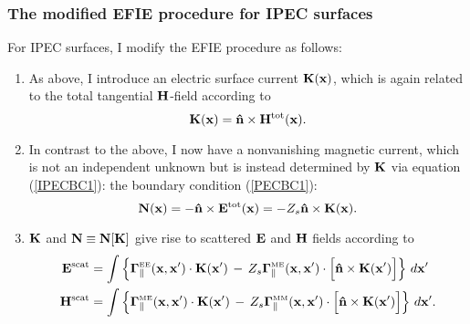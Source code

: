 \documentclass{article}
\begin{document}
\subsubsection*{The modified EFIE procedure for IPEC surfaces}
 
For IPEC surfaces, I modify the EFIE procedure as follows:
%
\begin{enumerate}
 \item As above, I introduce an electric surface current $\mathbf{K}(\mathbf{x})$,
       which is again related to the total tangential $\mathbf{H}$-field 
       according to 
       $$\mathbf{K}(\mathbf{x}) = \mathbf{\hat n}\times \mathbf{H}^{\hbox{\scriptsize{tot}}}(\mathbf{x}).$$
 \item In contrast to the above, I now have a nonvanishing magnetic 
       current, which is not an independent unknown but is instead
       determined by $\mathbf{K}$ via equation (\ref{IPECBC1}):
       the boundary condition (\ref{PECBC1}):
       $$\mathbf{N}(\mathbf{x}) = -\mathbf{\hat n}\times \mathbf{E}^{\hbox{\scriptsize{tot}}}(\mathbf{x})
                      = -Z_s \mathbf{\hat n}\times \mathbf{K}(\mathbf{x}).$$
 \item $\mathbf{K}$ and $\mathbf{N}\equiv \mathbf{N}[\mathbf{K}]$ give rise to scattered $\mathbf{E}$ and 
       $\mathbf{H}$ fields according to
       \begin{align*}
         \mathbf{E}^{\hbox{\scriptsize{scat}}} &= 
           \int \left\{       \boldsymbol{\Gamma}_{\parallel}^{\hbox{\tiny{EE}}}(\mathbf{x}, \mathbf{x}^\prime) 
                        \cdot \mathbf{K}(\mathbf{x}^\prime)
                        \,-\, 
                           Z_s\boldsymbol{\Gamma}_{\parallel}^{\hbox{\tiny{ME}}}(\mathbf{x}, \mathbf{x}^\prime) 
                        \cdot \Big[\mathbf{\hat n}\times \mathbf{K}(\mathbf{x}^\prime)\Big] 
                \right\}\,d\mathbf{x}^\prime
         \\
         \mathbf{H}^{\hbox{\scriptsize{scat}}} &= 
           \int \left\{       \boldsymbol{\Gamma}_{\parallel}^{\hbox{\tiny{ME}}}(\mathbf{x}, \mathbf{x}^\prime) 
                        \cdot \mathbf{K}(\mathbf{x}^\prime)
                        \,-\, 
                           Z_s\boldsymbol{\Gamma}_{\parallel}^{\hbox{\tiny{MM}}}(\mathbf{x}, \mathbf{x}^\prime) 
                        \cdot \Big[\mathbf{\hat n}\times \mathbf{K}(\mathbf{x}^\prime)\Big] 
                \right\}\,d\mathbf{x}^\prime.
       \end{align*}

\end{enumerate}
\end{document}
